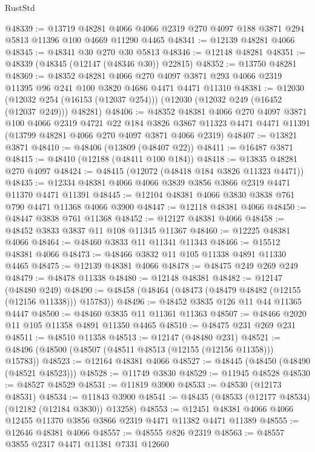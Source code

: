 \begin{lexlean}{RustStd}
\begin{coremodule}
@48339 := @13719
    @48281
    @4066
    @4066
    @2319
    @270
    @4097
    @188
    @3871
    @294
    @5813
    @11396
    @100
    @4669
    @11290
    @4465
@48341 := @12139 @48281 @4066
@48345 := @48341 @30 @270 @30 @5813
@48346 := @12148 @48281
@48351 := @48339 (@48345 (@12147 (@48346 @30)) @22815)
@48352 := @13750 @48281
@48369 := @48352
    @48281
    @4066
    @270
    @4097
    @3871
    @293
    @4066
    @2319
    @11395
    @96
    @241
    @100
    @3820
    @4686
    @4471
    @4471
    @11310
@48381 := @12030
    (@12032 @254 (@16153 (@12037 @254)))
    (@12030 (@12032 @249 (@16452 (@12037 @249))) @48281)
@48406 := @48352
    @48381
    @4066
    @270
    @4097
    @3871
    @100
    @4066
    @2319
    @4721
    @22
    @184
    @3826
    @3867
    @11323
    @4471
    @4471
    @11391
    (@13799 @48281 @4066 @270 @4097 @3871 @4066 @2319)
@48407 := @13821 @3871
@48410 := @48406 (@13809 (@48407 @22))
@48411 := @16487 @3871
@48415 := @48410 (@12188 (@48411 @100 @184))
@48418 := @13835 @48281 @270 @4097
@48424 := @48415 (@12072 (@48418 @184 @3826 @11323 @4471))
@48435 := @12334 @48381 @4066 @4066 @3839 @3856 @3866 @2319 @4471 @11370 @4471 @11391
@48445 := @12104 @48381 @4066 @3830 @3838 @761 @790 @4471 @11368 @4066 @3900
@48447 := @12118 @48381 @4066
@48450 := @48447 @3838 @761 @11368
@48452 := @12127 @48381 @4066
@48458 := @48452 @3833 @3837 @11 @108 @11345 @11367
@48460 := @12225 @48381 @4066
@48464 := @48460 @3833 @11 @11341 @11343
@48466 := @15512 @48381 @4066
@48473 := @48466 @3832 @11 @105 @11338 @4891 @11330 @4465
@48475 := @12139 @48381 @4066
@48478 := @48475 @249 @269 @249
@48479 := @48478 @11338
@48480 := @12148 @48381
@48482 := @12147 (@48480 @249)
@48490 := @48458 (@48464 (@48473 (@48479 @48482 (@12155 (@12156 @11338))) @15783))
@48496 := @48452 @3835 @126 @11 @44 @11365 @4447
@48500 := @48460 @3835 @11 @11361 @11363
@48507 := @48466 @2020 @11 @105 @11358 @4891 @11350 @4465
@48510 := @48475 @231 @269 @231
@48511 := @48510 @11358
@48513 := @12147 (@48480 @231)
@48521 := @48496 (@48500 (@48507 (@48511 @48513 (@12155 (@12156 @11358))) @15783))
@48523 := @12164 @48381 @4066
@48527 := @48445 (@48450 (@48490 (@48521 @48523)))
@48528 := @11749 @3830
@48529 := @11945 @48528
@48530 := @48527 @48529
@48531 := @11819 @3900
@48533 := @48530 (@12173 @48531)
@48534 := @11843 @3900
@48541 := @48435 (@48533 (@12177 @48534) (@12182 (@12184 @3830)) @13258)
@48553 := @12451 @48381 @4066 @4066 @12455 @11370 @3856 @3866 @2319 @4471 @11382 @4471 @11389
@48555 := @12646 @48381 @4066
@48557 := @48555 @826 @2319
@48563 := @48557 @3855 @2317 @4471 @11381 @7331 @12660

\end{coremodule}
\end{lexlean}
